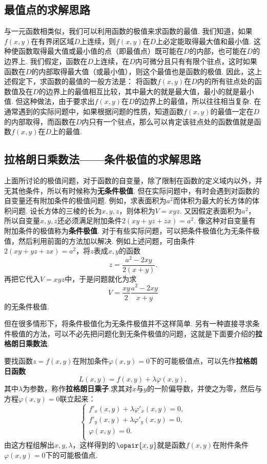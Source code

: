 \subsection{最值点的求解思路}
与一元函数相类似，我们可以利用函数的极值来求函数的最值.
我们知道，如果\(f(x,y)\)在有界闭区域\(D\)上连续，则\(f(x,y)\)在\(D\)上必定能取得最大值和最小值.
这种使函数取得最大值或最小值的点（即最值点）既可能在\(D\)的内部，也可能在\(D\)的边界上.
我们假定，函数在\(D\)上连续，在\(D\)内可微分且只有有限个驻点，这时如果函数在\(D\)的内部取得最大值（或最小值），则这个最值也是函数的极值.
因此，这上述假定下，求函数的最值的一般方法是：
将函数\(f(x,y)\)在\(D\)内的所有驻点处的函数值及在\(D\)的边界上的最值相互比较，其中最大的就是最大值，最小的就是最小值.
但这种做法，由于要求出\(f(x,y)\)在\(D\)的边界上的最值，所以往往相当复杂.
在通常遇到的实际问题中，如果根据问题的性质，知道函数\(f(x,y)\)的最值一定在\(D\)的内部取得，而函数在\(D\)内只有一个驻点，那么可以肯定该驻点处的函数值就是函数\(f(x,y)\)在\(D\)上的最值.

\subsection{拉格朗日乘数法——条件极值的求解思路}\label{subsection:多元函数微分法.拉格朗日乘数法}
上面所讨论的极值问题，对于函数的自变量，除了限制在函数的定义域内以外，并无其他条件，所以有时候称为\textbf{无条件极值}.
但在实际问题中，有时会遇到对函数的自变量还有附加条件的极值问题.
例如，求表面积为\(a^2\)而体积为最大的长方体的体积问题.
设长方体的三棱的长为\(x,y,z\)，则体积为\(V = xyz\).
又因假定表面积为\(a^2\)，所以自变量\(x,y,z\)还必须满足附加条件\(2(xy+yz+zx)=a^2\).
像这种对自变量有附加条件的极值称为\textbf{条件极值}.
对于有些实际问题，可以把条件极值化为无条件极值，然后利用前面的方法加以解决.
例如上述问题，可由条件\(2(xy+yz+zx)=a^2\)，将\(z\)表成\(x,y\)的函数\[
z = \frac{a^2-2xy}{2(x+y)}.
\]再把它代入\(V = xyz\)中，于是问题就化为求\[
V = \frac{xy}{2} \frac{a^2-2xy}{x+y}
\]的无条件极值.

但在很多情形下，将条件极值化为无条件极值并不这样简单.
另有一种直接寻求条件极值的方法，可以不必先把问题化到无条件极值的问题，这就是下面要介绍的\textbf{拉格朗日乘数法}.

要找函数\(z=f(x,y)\)在附加条件\(\varphi(x,y)=0\)下的可能极值点，可以先作\textbf{拉格朗日函数}\[
L(x,y) = f(x,y)+\lambda \varphi(x,y),
\]其中\(\lambda\)为参数，称作\textbf{拉格朗日乘子}.求其对\(x\)与\(y\)的一阶偏导数，并使之为零，然后与方程\(\varphi(x,y)=0\)联立起来：\[
\left\{ \begin{array}{l}
f'_x(x,y)+\lambda\varphi'_x(x,y)=0, \\
f'_y(x,y)+\lambda\varphi'_y(x,y)=0, \\
\varphi(x,y)=0. \\
\end{array} \right.
\]由这方程组解出\(x,y,\lambda\)，这样得到的\(\opair{x,y}\)就是函数\(f(x,y)\)在附件条件\(\varphi(x,y)=0\)下的可能极值点.

